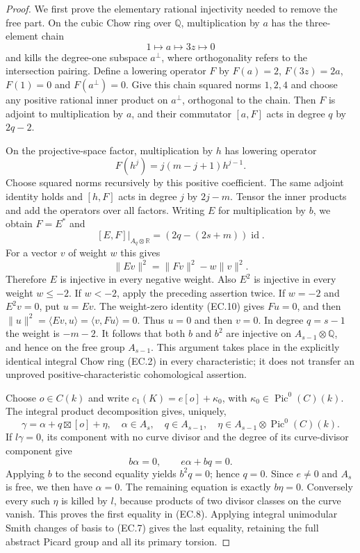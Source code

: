 \begin{proof}
We first prove the elementary rational injectivity needed to remove
the free part. On the cubic Chow ring over $\mathbb Q$, multiplication
by $a$ has the three-element chain
\[
 1\longmapsto a\longmapsto 3z\longmapsto0
\]
and kills the degree-one subspace $a^\perp$, where orthogonality
refers to the intersection pairing. Define a lowering operator $F$
by $F(a)=2$, $F(3z)=2a$, $F(1)=0$ and $F(a^\perp)=0$.
Give this chain squared norms $1,2,4$ and choose any positive
rational inner product on $a^\perp$, orthogonal to the chain.
Then $F$ is adjoint to multiplication by $a$, and their commutator
$[a,F]$ acts in degree $q$ by $2q-2$.

On the projective-space factor, multiplication by $h$ has lowering
operator
\[
 F(h^j)=j(m-j+1)h^{j-1}.
\]
Choose squared norms recursively by this positive coefficient.
The same adjoint identity holds and $[h,F]$ acts in degree $j$ by
$2j-m$. Tensor the inner products and add the operators over all
factors. Writing $E$ for multiplication by $b$, we obtain
$F=E^*$ and
\[
 [E,F]\big|_{A_q\otimes\mathbb R}
       =(2q-(2s+m))\operatorname{id}.
 \tag{EC.9}
\]
For a vector $v$ of weight $w$ this gives
\[
 \|Ev\|^2=\|Fv\|^2-w\|v\|^2.
 \tag{EC.10}
\]
Therefore $E$ is injective in every negative weight. Also $E^2$
is injective in every weight $w\le-2$. If $w<-2$, apply the
preceding assertion twice. If $w=-2$ and $E^2v=0$, put $u=Ev$.
The weight-zero identity (EC.10) gives $Fu=0$, and then
$\|u\|^2=\langle Ev,u\rangle=\langle v,Fu\rangle=0$.
Thus $u=0$ and then $v=0$.
In degree $q=s-1$ the weight is $-m-2$.
It follows that both $b$ and $b^2$ are injective on
$A_{s-1}\otimes\mathbb Q$, and hence on the free group $A_{s-1}$.
This argument takes place in the explicitly identical integral
Chow ring (EC.2) in every characteristic; it does not transfer an
unproved positive-characteristic cohomological assertion.

Choose $o\in C(k)$ and write $c_1(K)=e[o]+\kappa_0$, with
$\kappa_0\in\operatorname{Pic}^0(C)(k)$. The integral product
decomposition gives, uniquely,
\[
 \gamma=\alpha+q\boxtimes[o]+\eta,
 \quad
 \alpha\in A_s,\quad q\in A_{s-1},\quad
 \eta\in A_{s-1}\otimes\operatorname{Pic}^0(C)(k).
\]
If $l\gamma=0$, its component with no curve divisor and the
degree of its curve-divisor component give
\[
 b\alpha=0,\qquad e\alpha+bq=0.
 \tag{EC.11}
\]
Applying $b$ to the second equality yields $b^2q=0$; hence $q=0$.
Since $e\ne0$ and $A_s$ is free, we then have $\alpha=0$.
The remaining equation is exactly $b\eta=0$.
Conversely every such $\eta$ is killed by $l$, because products of
two divisor classes on the curve vanish. This proves the first
equality in (EC.8). Applying integral unimodular Smith changes of
basis to (EC.7) gives the last equality, retaining the full abstract
Picard group and all its primary torsion.
\end{proof}


